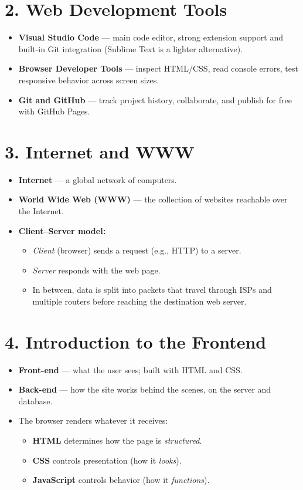 \documentclass[12pt]{article}
\begin{document}
\section{2. Web Development Tools}
\begin{itemize}
    \item \textbf{Visual Studio Code} — main code editor, strong extension support and built-in Git integration (Sublime Text is a lighter alternative).
    \item \textbf{Browser Developer Tools} — inspect HTML/CSS, read console errors, test responsive behavior across screen sizes.
    \item \textbf{Git and GitHub} — track project history, collaborate, and publish for free with GitHub Pages.
\end{itemize}

\section{3. Internet and WWW}
\begin{itemize}
    \item \textbf{Internet} — a global network of computers.
    \item \textbf{World Wide Web (WWW)} — the collection of websites reachable over the Internet.
    \item \textbf{Client–Server model:}
    \begin{itemize}
        \item \emph{Client} (browser) sends a request (e.g., HTTP) to a server.
        \item \emph{Server} responds with the web page.
        \item In between, data is split into packets that travel through ISPs and multiple routers before reaching the destination web server.
    \end{itemize}
\end{itemize}

\section{4. Introduction to the Frontend}
\begin{itemize}
    \item \textbf{Front-end} — what the user sees; built with HTML and CSS.
    \item \textbf{Back-end} — how the site works behind the scenes, on the server and database.
    \item The browser renders whatever it receives:
    \begin{itemize}
        \item \textbf{HTML} determines how the page is \emph{structured}.
        \item \textbf{CSS} controls presentation (how it \emph{looks}).
        \item \textbf{JavaScript} controls behavior (how it \emph{functions}).
    \end{itemize}
\end{itemize}
\end{document}
